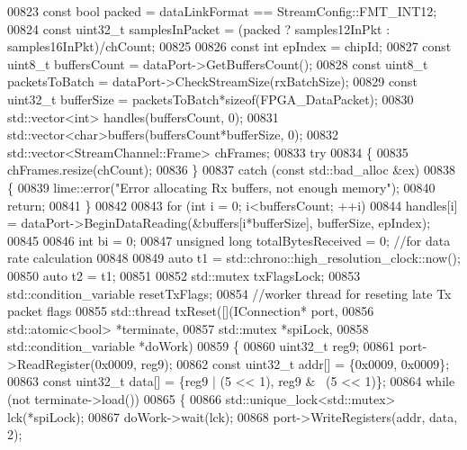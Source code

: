\begin{DoxyCode}
{{00823     \textcolor{keyword}{const} \textcolor{keywordtype}{bool} packed = dataLinkFormat == StreamConfig::FMT_INT12;
00824     \textcolor{keyword}{const} uint32\_t samplesInPacket = (packed  ? samples12InPkt : samples16InPkt)/chCount;
00825 
00826     \textcolor{keyword}{const} \textcolor{keywordtype}{int} epIndex = chipId;
00827     \textcolor{keyword}{const} uint8\_t buffersCount = dataPort->GetBuffersCount();
00828     \textcolor{keyword}{const} uint8\_t packetsToBatch = dataPort->CheckStreamSize(rxBatchSize);
00829     \textcolor{keyword}{const} uint32\_t bufferSize = packetsToBatch*\textcolor{keyword}{sizeof}(FPGA_DataPacket);
00830     std::vector<int> handles(buffersCount, 0);
00831     std::vector<char>buffers(buffersCount*bufferSize, 0);
00832     std::vector<StreamChannel::Frame> chFrames;
00833     \textcolor{keywordflow}{try}
00834     \{
00835         chFrames.resize(chCount);
00836     \}
00837     \textcolor{keywordflow}{catch} (\textcolor{keyword}{const} std::bad\_alloc &ex)
00838     \{
00839         lime::error(\textcolor{stringliteral}{"Error allocating Rx buffers, not enough memory"});
00840         \textcolor{keywordflow}{return};
00841     \}
00842 
00843     \textcolor{keywordflow}{for} (\textcolor{keywordtype}{int} i = 0; i<buffersCount; ++i)
00844         handles[i] = dataPort->BeginDataReading(&buffers[i*bufferSize], bufferSize, epIndex);
00845 
00846     \textcolor{keywordtype}{int} bi = 0;
00847     \textcolor{keywordtype}{unsigned} \textcolor{keywordtype}{long} totalBytesReceived = 0; \textcolor{comment}{//for data rate calculation}
00848 
00849     \textcolor{keyword}{auto} t1 = std::chrono::high\_resolution\_clock::now();
00850     \textcolor{keyword}{auto} t2 = t1;
00851 
00852     std::mutex txFlagsLock;
00853     std::condition\_variable resetTxFlags;
00854     \textcolor{comment}{//worker thread for reseting late Tx packet flags}
00855     std::thread txReset([](IConnection* port,
00856                         std::atomic<bool> *terminate,
00857                         std::mutex *spiLock,
00858                         std::condition\_variable *doWork)
00859     \{
00860         uint32\_t reg9;
00861         port->ReadRegister(0x0009, reg9);
00862         \textcolor{keyword}{const} uint32\_t addr[] = \{0x0009, 0x0009\};
00863         \textcolor{keyword}{const} uint32\_t data[] = \{reg9 | (5 << 1), reg9 & ~(5 << 1)\};
00864         \textcolor{keywordflow}{while} (not terminate->load())
00865         \{
00866             std::unique\_lock<std::mutex> lck(*spiLock);
00867             doWork->wait(lck);
00868             port->WriteRegisters(addr, data, 2);
}}
\end{DoxyCode}
